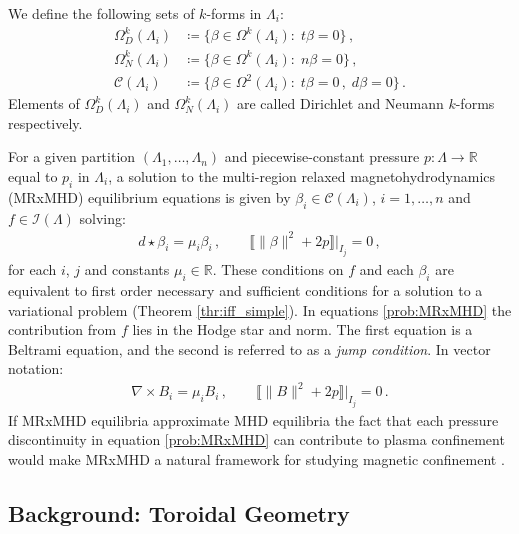 \documentclass[11pt]{article}
\theoremstyle{plain}
\theoremstyle{definition}
\theoremstyle{remark}
\newcommand{\R}{\mathbb{R}}
\newcommand{\ST}{\Lambda}
\newcommand{\C}{\mathcal{C} (\ST_i)}
\newcommand{\I}{\mathcal{I}(\ST)}
\begin{document}
We define the following sets of \(k\)-forms in \(\ST_i\):
\begin{align*}
   \Omega^k_D( \ST_i ) &\coloneqq \{  \beta  \in   \Omega^k( \ST_i )  : \; t\beta  = 0 \} \, , \\
   \Omega^k_N( \ST_i ) &\coloneqq \{  \beta  \in   \Omega^k( \ST_i )  : \; n \beta  = 0 \} \, , \\
  \C &\coloneqq  \{  \beta  \in   \Omega^2( \ST_i )  : \; t \beta  = 0 \, , \; d \beta  = 0 \} \, .
\end{align*}
Elements of \(\Omega^k_D( \ST_i )\) and \( \Omega^k_N( \ST_i )\) are called Dirichlet and Neumann \(k\)-forms respectively. 





For a given partition \((\ST_1, \dots,\ST_n)\) and piecewise-constant pressure \(p : \ST \to \R\) equal to \(p_i\) in \(\ST_i\), a solution to the multi-region relaxed magnetohydrodynamics (MRxMHD) equilibrium equations is given by \(\beta _i\in \C \), \(i = 1, \dots, n\) and \(f \in \I\) solving:
\begin{align}
\label{prob:MRxMHD} 
  d \star \beta _i = \mu_i \beta _i \, , \qquad 
  \big\llbracket \| \beta  \|^2 + 2p \big\rrbracket \big|_{I_j} = 0 \, , 
\end{align}
for each \(i\), \(j\) and constants \(\mu_i \in \R\). These conditions on \(f\) and each \(\beta _i\) are equivalent to first order necessary and sufficient conditions for a solution to a variational problem (Theorem \ref{thr:iff_simple}). In equations \eqref{prob:MRxMHD} the contribution from \(f\) lies in the Hodge star and norm. The first equation is a Beltrami equation, and the second is referred to as a \textit{jump condition}. In vector notation:
\begin{align*}
  \nabla \times B_i = \mu_i B_i \, , \qquad 
  \big\llbracket \|B\|^2 + 2 p  \big\rrbracket \big|_{I_j} = 0 \, .
\end{align*}
If MRxMHD equilibria approximate MHD equilibria the fact that each pressure discontinuity in equation \eqref{prob:MRxMHD} can contribute to plasma confinement would make MRxMHD a natural framework for studying magnetic confinement \cite{10.1063/1.4765691}.




\subsection{Background: Toroidal Geometry}\label{sub:back}
\end{document}
